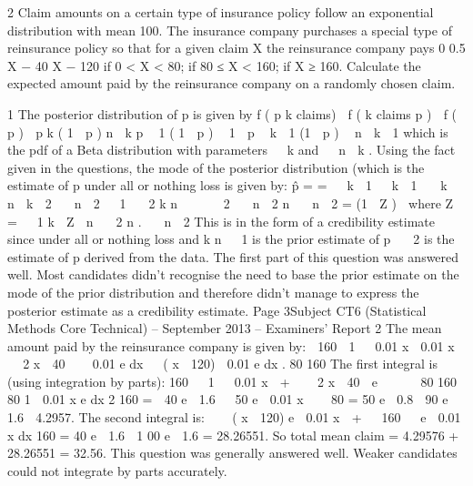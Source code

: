 \documentclass[a4paper,12pt]{article}
\begin{document}
2
Claim amounts on a certain type of insurance policy follow an exponential
distribution with mean 100. The insurance company purchases a special type of
reinsurance policy so that for a given claim X the reinsurance company pays
0
0.5 X − 40
X − 120
if 0 < X < 80;
if 80 ≤ X < 160;
if X ≥ 160.
Calculate the expected amount paid by the reinsurance company on a randomly
chosen claim.


1
The posterior distribution of p is given by
f ( p k claims)  f ( k claims p )  f ( p )
 p k ( 1  p ) n  k p  1 ( 1  p )  1
 p  k  1 (1  p )  n  k  1
which is the pdf of a Beta distribution with parameters   k and   n  k .
Using the fact given in the questions, the mode of the posterior distribution (which is
the estimate of p under all or nothing loss is given by:
p̂ =
=
  k  1
  k  1

 k  n  k  2  n  2
  1
 2
k
n

 
 2  n  2 n  n  2
= (1  Z ) 
where Z
=
  1
k
 Z 
n
 2
n
.
 n  2
This is in the form of a credibility estimate since
under all or nothing loss and k
n
  1
is the prior estimate of p
 2
is the estimate of p derived from the data.
The first part of this question was answered well. Most candidates didn’t recognise the need
to base the prior estimate on the mode of the prior distribution and therefore didn’t manage
to express the posterior estimate as a credibility estimate.
Page 3Subject CT6 (Statistical Methods Core Technical) – September 2013 – Examiners’ Report
2
The mean amount paid by the reinsurance company is given by:

160
 1

 0.01 x
 0.01 x
   2 x  40    0.01 e dx   ( x  120)  0.01 e dx .
80
160
The first integral is (using integration by parts):
160
  1
  0.01 x 
+
   2 x  40  e


 
 80
160

80
1  0.01 x
e
dx
2
160
=  40 e  1.6   50 e  0.01 x 

 80
= 50 e  0.8  90 e  1.6  4.2957.
The second integral is:

  ( x  120) e  0.01 x 
+

 160

 e
 0.01 x
dx
160
= 40 e  1.6  1 00 e  1.6
= 28.26551.
So total mean claim = 4.29576 + 28.26551 = 32.56.
This question was generally answered well. Weaker candidates could not integrate by parts
accurately.
\end{document}
